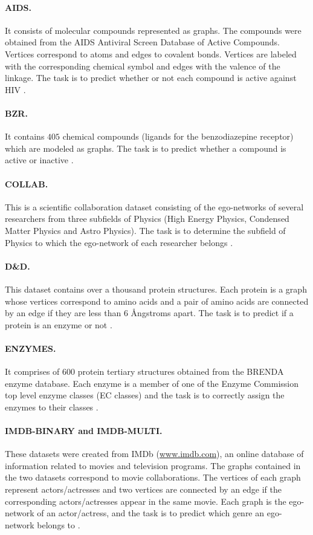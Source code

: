 \documentclass[twoside,11pt]{article}
\begin{document}
\paragraph{AIDS.} It consists of molecular compounds represented as graphs.
The compounds were obtained from the AIDS Antiviral Screen Database of Active Compounds.
Vertices correspond to atoms and edges to covalent bonds.
Vertices are labeled with the corresponding chemical symbol and edges with the valence of the linkage.
The task is to predict whether or not each compound is active against HIV .
\paragraph{BZR.} It contains $405$ chemical compounds (ligands for the benzodiazepine receptor) which are modeled as graphs.
The task is to predict whether a compound is active or inactive .
\paragraph{COLLAB.} This is a scientific collaboration dataset consisting of the ego-networks of several researchers from three subfields of Physics (High Energy Physics, Condensed Matter Physics and Astro Physics).
The task is to determine the subfield of Physics to which the ego-network of each researcher belongs . 
\paragraph{D\&D.} This dataset contains over a thousand protein structures.
Each protein is a graph whose vertices correspond to amino acids and a pair of amino acids are connected by an edge if they are less than $6$ \AA ngstroms apart.
The task is to predict if a protein is an enzyme or not .
\paragraph{ENZYMES.} It comprises of $600$ protein tertiary structures obtained from the BRENDA enzyme database.
Each enzyme is a member of one of the Enzyme Commission top level enzyme classes (EC classes) and the task is to correctly assign the enzymes to their classes .
\paragraph{IMDB-BINARY and IMDB-MULTI.} These datasets were created from IMDb (\url{www.imdb.com}), an online database of information related to movies and television programs. 
The graphs contained in the two datasets correspond to movie collaborations.
The vertices of each graph represent actors/actresses and two vertices are connected by an edge if the corresponding actors/actresses appear in the same movie.
Each graph is the ego-network of an actor/actress, and the task is to predict which genre an ego-network belongs to .
\end{document}
